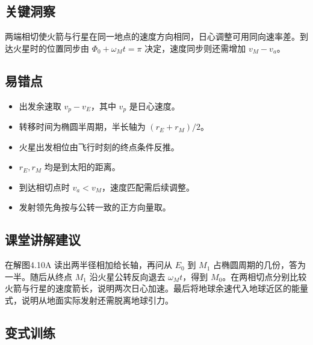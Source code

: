 \documentclass[UTF8,fontset=fandol,a4paper,11pt]{ctexart}
\begin{document}


\subsection*{关键洞察}

两端相切使火箭与行星在同一地点的速度方向相同，日心调整可用同向速率差。到达火星时的位置同步由 $\Phi_0+\omega_Mt=\pi$ 决定，速度同步则还需增加 $v_M-v_a$。



\subsection*{易错点}

\begin{itemize}
\item 出发余速取 $v_p-v_E$，其中 $v_p$ 是日心速度。
\item 转移时间为椭圆半周期，半长轴为 $(r_E+r_M)/2$。
\item 火星出发相位由飞行时刻的终点条件反推。
\item $r_E,r_M$ 均是到太阳的距离。
\item 到达相切点时 $v_a<v_M$，速度匹配需后续调整。
\item 发射领先角按与公转一致的正方向量取。
\end{itemize}



\subsection*{课堂讲解建议}

在解图4.10A 读出两半径相加给长轴，再问从 $E_0$ 到 $M_1$ 占椭圆周期的几份，答为一半。随后从终点 $M_1$ 沿火星公转反向退去 $\omega_Mt$，得到 $M_0$。在两相切点分别比较火箭与行星的速度箭长，说明两次日心加速。最后将地球余速代入地球近区的能量式，说明从地面实际发射还需脱离地球引力。



\subsection*{变式训练}
\end{document}
